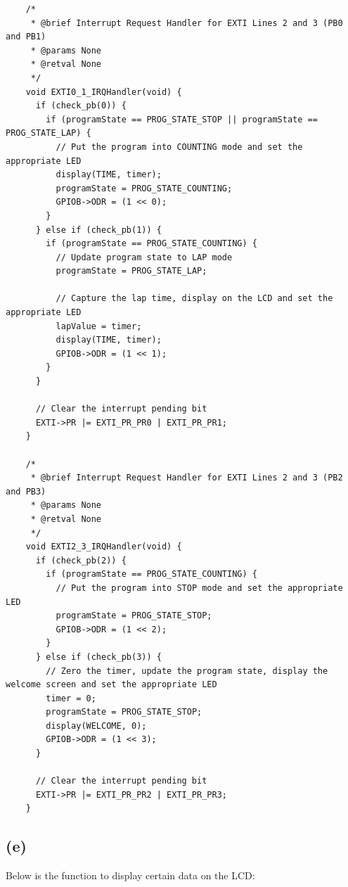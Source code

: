  \begin{verbatim}
    /*
     * @brief Interrupt Request Handler for EXTI Lines 2 and 3 (PB0 and PB1)
     * @params None
     * @retval None
     */
    void EXTI0_1_IRQHandler(void) {
      if (check_pb(0)) {
        if (programState == PROG_STATE_STOP || programState == PROG_STATE_LAP) {
          // Put the program into COUNTING mode and set the appropriate LED
          display(TIME, timer);
          programState = PROG_STATE_COUNTING;
          GPIOB->ODR = (1 << 0);
        }
      } else if (check_pb(1)) {
        if (programState == PROG_STATE_COUNTING) {
          // Update program state to LAP mode
          programState = PROG_STATE_LAP;

          // Capture the lap time, display on the LCD and set the appropriate LED
          lapValue = timer;
          display(TIME, timer);
          GPIOB->ODR = (1 << 1);
        }
      }

      // Clear the interrupt pending bit
      EXTI->PR |= EXTI_PR_PR0 | EXTI_PR_PR1;
    }

    /*
     * @brief Interrupt Request Handler for EXTI Lines 2 and 3 (PB2 and PB3)
     * @params None
     * @retval None
     */
    void EXTI2_3_IRQHandler(void) {
      if (check_pb(2)) {
        if (programState == PROG_STATE_COUNTING) {
          // Put the program into STOP mode and set the appropriate LED
          programState = PROG_STATE_STOP;
          GPIOB->ODR = (1 << 2);
        }
      } else if (check_pb(3)) {
        // Zero the timer, update the program state, display the welcome screen and set the appropriate LED
        timer = 0;
        programState = PROG_STATE_STOP;
        display(WELCOME, 0);
        GPIOB->ODR = (1 << 3);
      }

      // Clear the interrupt pending bit
      EXTI->PR |= EXTI_PR_PR2 | EXTI_PR_PR3;
    }
  \end{verbatim}
  \vspace{0.5cm}

\newpage
\subsection*{(e)}
\label{sub:(e)}

Below is the function to display certain data on the LCD:\\

